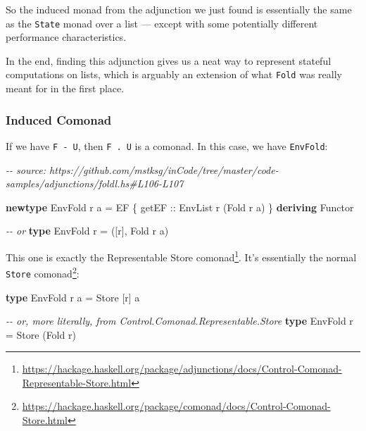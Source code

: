 \documentclass[]{article}
\newenvironment{Shaded}{}{}
\newcommand{\CommentTok}[1]{\textcolor[rgb]{0.38,0.63,0.69}{\textit{#1}}}
\newcommand{\DataTypeTok}[1]{\textcolor[rgb]{0.56,0.13,0.00}{#1}}
\newcommand{\KeywordTok}[1]{\textcolor[rgb]{0.00,0.44,0.13}{\textbf{#1}}}
\newcommand{\NormalTok}[1]{#1}
\newcommand{\OtherTok}[1]{\textcolor[rgb]{0.00,0.44,0.13}{#1}}
\renewcommand{\href}[2]{#2\footnote{\url{#1}}}
\begin{document}
So the induced monad from the adjunction we just found is essentially the same
as the \texttt{State} monad over a list --- except with some potentially
different performance characteristics.

In the end, finding this adjunction gives us a neat way to represent stateful
computations on lists, which is arguably an extension of what \texttt{Fold} was
really meant for in the first place.

\hypertarget{induced-comonad}{%
\subsubsection{Induced Comonad}\label{induced-comonad}}

If we have \texttt{F\ -\textbar{}\ U}, then \texttt{F\ .\ U} is a comonad. In
this case, we have \texttt{EnvFold}:

\begin{Shaded}
\begin{Highlighting}[]
\CommentTok{{-}{-} source: https://github.com/mstksg/inCode/tree/master/code{-}samples/adjunctions/foldl.hs\#L106{-}L107}

\KeywordTok{newtype} \DataTypeTok{EnvFold}\NormalTok{ r a }\OtherTok{=} \DataTypeTok{EF}\NormalTok{ \{}\OtherTok{ getEF ::} \DataTypeTok{EnvList}\NormalTok{ r (}\DataTypeTok{Fold}\NormalTok{ r a) \}}
  \KeywordTok{deriving} \DataTypeTok{Functor}

\CommentTok{{-}{-} or}
\KeywordTok{type} \DataTypeTok{EnvFold}\NormalTok{ r }\OtherTok{=}\NormalTok{ ([r], }\DataTypeTok{Fold}\NormalTok{ r a)}
\end{Highlighting}
\end{Shaded}

This one is exactly the
\href{https://hackage.haskell.org/package/adjunctions/docs/Control-Comonad-Representable-Store.html}{Representable
Store comonad}. It's essentially the normal
\href{https://hackage.haskell.org/package/comonad/docs/Control-Comonad-Store.html}{\texttt{Store}
comonad}:

\begin{Shaded}
\begin{Highlighting}[]
\KeywordTok{type} \DataTypeTok{EnvFold}\NormalTok{ r a }\OtherTok{=} \DataTypeTok{Store}\NormalTok{ [r] a}

\CommentTok{{-}{-} or, more literally, from Control.Comonad.Representable.Store}
\KeywordTok{type} \DataTypeTok{EnvFold}\NormalTok{ r }\OtherTok{=} \DataTypeTok{Store}\NormalTok{ (}\DataTypeTok{Fold}\NormalTok{ r)}
\end{Highlighting}
\end{Shaded}
\end{document}
